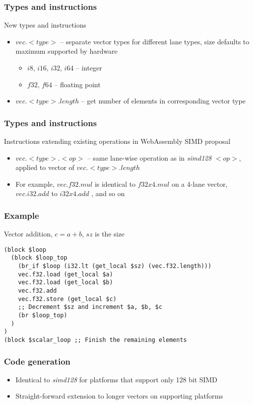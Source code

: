 \documentclass[t,aspectratio=169, xcolor={table}]{beamer}
\begin{document}
\begin{frame}
\frametitle{Types and instructions}
New types and instructions
  \begin{itemize}
  \item $vec.<type>$ -- separate vector types for different lane types, size defaults to maximum supported by hardware
    \begin{itemize}
    \item $i8$, $i16$, $i32$, $i64$ -- integer
    \item $f32$, $f64$ -- floating point
    \end{itemize}
  \item $vec.<type>.length$ -- get number of elements in corresponding vector type
  \end{itemize}
\end{frame}
\begin{frame}
\frametitle{Types and instructions}
Instructions extending existing operations in WebAssembly SIMD proposal
  \begin{itemize}
  \item $vec.<type>.<op>$ -- same lane-wise operation as in \textit{simd128} $<op>$, applied to vector of $vec.<type>.length$
  \item[] For example, $vec.f32.mul$ is identical to $f32x4.mul$ on a 4-lane vector, $vec.i32.add$ to $i32x4.add$ , and so on
  \end{itemize}
\end{frame}
\begin{frame}[containsverbatim]
\frametitle{Example}
Vector addition, $c = a + b$, $sz$ is the size
\begin{lstlisting}
(block $loop
  (block $loop_top
    (br_if $loop (i32.lt (get_local $sz) (vec.f32.length)))
    vec.f32.load (get_local $a)
    vec.f32.load (get_local $b)
    vec.f32.add
    vec.f32.store (get_local $c)
    ;; Decrement $sz and increment $a, $b, $c
    (br $loop_top)
  )
)
(block $scalar_loop ;; Finish the remaining elements
\end{lstlisting}
\end{frame}
\begin{frame}
\frametitle{Code generation}
  \begin{itemize}
  \item Identical to \textit{simd128} for platforms that support only 128 bit SIMD
  \item Straight-forward extension to longer vectors on supporting platforms
  \end{itemize}
\end{frame}
\end{document}
